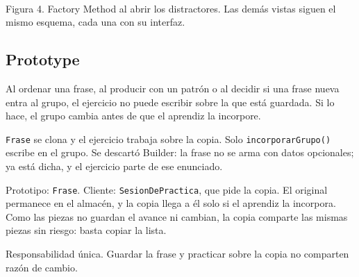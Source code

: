 \documentclass[11pt]{article}
\begin{document}
\begin{center}
\\[0.3em]
{\small Figura 4. Factory Method al abrir los distractores. Las demás vistas siguen el mismo esquema, cada una con su interfaz.}
\end{center}

\subsection{Prototype}

\begin{description}
  \raggedright
  \item[Problema.] Al ordenar una frase, al producir con un patrón o al decidir si una frase nueva entra al grupo, el ejercicio no puede escribir sobre la que está guardada. Si lo hace, el grupo cambia antes de que el aprendiz la incorpore.
  \item[Solución.] \texttt{Frase} se clona y el ejercicio trabaja sobre la copia. Solo \texttt{incorporarGrupo()} escribe en el grupo. Se descartó Builder: la frase no se arma con datos opcionales; ya está dicha, y el ejercicio parte de ese enunciado.
  \item[Participantes.] Prototipo: \texttt{Frase}. Cliente: \texttt{SesionDePractica}, que pide la copia. El original permanece en el almacén, y la copia llega a él solo si el aprendiz la incorpora. Como las piezas no guardan el avance ni cambian, la copia comparte las mismas piezas sin riesgo: basta copiar la lista.
  \item[SOLID.] Responsabilidad única. Guardar la frase y practicar sobre la copia no comparten razón de cambio.
\end{description}
\end{document}
